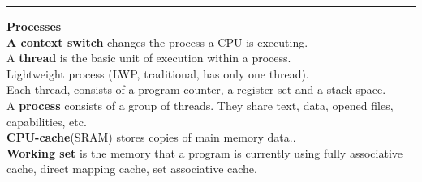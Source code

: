 \documentclass[8pt,a4paper,landscape]{article}
\newcommand{\topic}[1]{\textbf{\large #1}}
\begin{document}
\begin{spacing}{-1}
\begin{multicols*}{3}
\hrule \noindent
\topic{Processes} \\
\textbf{A context switch} changes the process a CPU is executing. \\
A \textbf{thread} is the basic unit of execution within a process. \\
Lightweight process (LWP, traditional, has only one thread). \\
Each thread, consists of a program counter, a register set and a stack space. \\
A \textbf{process} consists of a group of threads. They share text, data, opened files, capabilities, etc. \\
\textbf{CPU-cache}(SRAM) stores copies of main memory data.. \\
\textbf{Working set} is the memory that a program is currently using
fully associative cache, direct mapping cache, set associative cache. \\


\end{multicols*}
\end{spacing}
\end{document}
